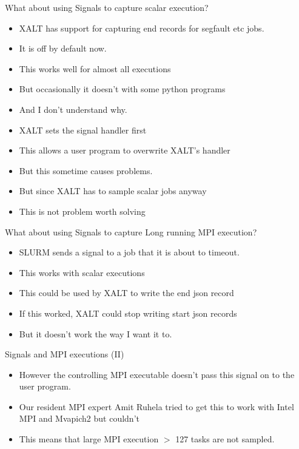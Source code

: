 \documentclass{beamer}
\begin{document}
\begin{frame}{What about using Signals to capture scalar execution?}
  \begin{itemize}
    \item XALT has support for capturing end records for segfault etc
      jobs.
    \item It is off by default now.
    \item This works well for almost all executions
    \item But occasionally it doesn't with some python programs
    \item And I don't understand why.
    \item XALT sets the signal handler first
    \item This allows a user program to overwrite XALT's handler
    \item But this sometime causes problems.
    \item But since XALT has to sample scalar jobs anyway 
    \item This is not problem worth solving
  \end{itemize}
\end{frame}

\begin{frame}{What about using Signals to capture Long running MPI execution?}
  \begin{itemize}
    \item SLURM sends a signal to a job that it is about to timeout.
    \item This works with scalar executions
    \item This could be used by XALT to write the end json record
    \item If this worked, XALT could stop writing start json records 
    \item But it doesn't work the way I want it to.
  \end{itemize}
\end{frame}

\begin{frame}{Signals and MPI executions (II)}
  \begin{itemize}
    \item However the controlling MPI executable doesn't pass this
      signal on to the user program.
    \item Our resident MPI expert Amit Ruhela tried to get this to
      work with Intel MPI and Mvapich2 but couldn't
    \item This means that large MPI execution $>$ 127 tasks are not sampled.
  \end{itemize}
\end{frame}
\end{document}
